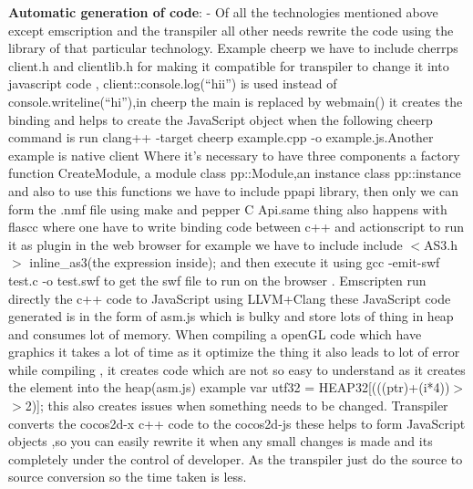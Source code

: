 \documentclass[23pt]{article}
\begin{document}
{\Large \textbf{ Automatic generation of code}: - Of all the technologies mentioned above except emscription and the transpiler all other needs rewrite the code using the library of that particular technology.
Example cheerp we have to include cherrps client.h and clientlib.h for making it compatible for  transpiler to change it into javascript code ,  client::console.log(“hii”) is used instead of console.writeline(“hi”),in cheerp the main is replaced by webmain() it creates the binding and helps to create the JavaScript object when the following cheerp command is run clang++ -target cheerp example.cpp -o example.js.Another example is native client 
Where it’s necessary to have three components a factory function CreateModule, a module class pp::Module,an instance class pp::instance and also to use this functions we have to include ppapi library, \cite{comparenacl1}  then only we can form the .nmf file using make and pepper C Api.same thing also happens with flascc where one have to write binding code between c++ and actionscript to run it as plugin in the web browser for example we have to include  include $<$AS3.h$>$ inline\_as3(the expression inside); and then execute it using gcc -emit-swf test.c -o test.swf to get the swf file to run on the browser \cite{compareflasc3}.  Emscripten run directly the c++ code to JavaScript using LLVM+Clang these JavaScript code generated is in the form of asm.js which is bulky and store lots of thing in heap and consumes lot of memory. When compiling a openGL code which have graphics it takes a lot of time as it optimize the thing it also leads to lot of error while compiling , it creates code which are not so easy to understand as it creates the element into the heap(asm.js)  example  var utf32 = HEAP32[(((ptr)+(i*4))$>$ $>$2)];  this also creates issues when something needs to be changed. Transpiler converts the cocos2d-x c++ code to the cocos2d-js these helps to form JavaScript objects ,so you can easily rewrite it when any small changes is made and its completely under the control of developer. As the transpiler just do the source to source conversion so the time taken is less. \cite{compareems2} \\
}
\end{document}
